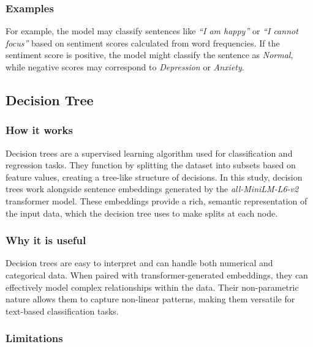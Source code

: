 \documentclass[runningheads,a4paper,11pt]{report}
\begin{document}
\subsubsection{Examples}
\label{subsubsection:linear_regression_examples}

For example, the model may classify sentences like \textit{``I am happy''} or \textit{``I cannot focus''} based on sentiment scores calculated from word frequencies. If the sentiment score is positive, the model might classify the sentence as \textit{Normal}, while negative scores may correspond to \textit{Depression} or \textit{Anxiety}.

\subsection{Decision Tree}
\label{subsection:decision_tree}

\subsubsection{How it works}
\label{subsubsection:decision_tree_how_it_works}

Decision trees are a supervised learning algorithm used for classification and regression tasks. They function by splitting the dataset into subsets based on feature values, creating a tree-like structure of decisions. In this study, decision trees work alongside sentence embeddings generated by the \textit{all-MiniLM-L6-v2} transformer model. These embeddings provide a rich, semantic representation of the input data, which the decision tree uses to make splits at each node.

\subsubsection{Why it is useful}
\label{subsubsection:decision_tree_why_useful}

Decision trees are easy to interpret and can handle both numerical and categorical data. When paired with transformer-generated embeddings, they can effectively model complex relationships within the data. Their non-parametric nature allows them to capture non-linear patterns, making them versatile for text-based classification tasks.

\subsubsection{Limitations}
\label{subsubsection:decision_tree_limitations}
\end{document}

